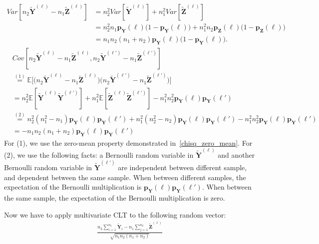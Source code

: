 \documentclass[11pt]{article} %
\newcommand{\vecBold}[1]{\boldsymbol{#1}} %
\newcommand{\distparamMultinom}{\boldsymbol{p}}
\newcommand{\mE}{\mathbb{E}} %
\newcommand{\rvY}{Y}
\newcommand{\rVecY}{\vecBold{\rvY}}
\newcommand{\rvZ}{Z}
\newcommand{\rVecZ}{\vecBold{\rvZ}}
\begin{document}
\begin{align*}
	Var[
n_2
		\tilde{\rVecY}^{(\ell)}
		-
		n_1
		\tilde{\rVecZ}^{(\ell)}	
	]
&=
n_2^2
	Var[
		\tilde{\rVecY}^{(\ell)}]
+		
n_1^2
Var[
\tilde{\rVecZ}^{(\ell)}	
	]
	\\
	&=
n_2^2 n_1
\distparamMultinom_{\rVecY}(\ell)
\bigl(
1-\distparamMultinom_{\rVecY}(\ell)
\bigr)
+		
n_1^2 n_2
\distparamMultinom_{\rVecZ}(\ell)
\bigl(
1-\distparamMultinom_{\rVecZ}(\ell)
\bigr)
\\&=
n_1n_2(n_1+n_2)
\distparamMultinom_{\rVecY}(\ell)
\bigl(
1-\distparamMultinom_{\rVecY}(\ell)
\bigr).
\end{align*}
%
\begin{align*}
	&
	Cov[
n_2\tilde{\rVecY}^{(\ell)}
		-
		n_1
		\tilde{\rVecZ}^{(\ell)}
,
n_2\tilde{\rVecY}^{(\ell')}
		-
		n_1
		\tilde{\rVecZ}^{(\ell')}	
	]
\\&\stackrel{(1)}{=}
\mE
\bigl[
\bigl(
n_2\tilde{\rVecY}^{(\ell)}
		-
		n_1
		\tilde{\rVecZ}^{(\ell)}
\bigr)
\bigl(
n_2\tilde{\rVecY}^{(\ell')}
		-
		n_1
		\tilde{\rVecZ}^{(\ell')}
\bigr)
\bigr]
\\&=
n_2^2\mE[\tilde{\rVecY}^{(\ell)} \tilde{\rVecY}^{(\ell')}]
+
n_1^2\mE[\tilde{\rVecZ}^{(\ell)} \tilde{\rVecZ}^{(\ell')}]
-n_1^2 n_2^2
\distparamMultinom_{\rVecY}(\ell)
\distparamMultinom_{\rVecY}(\ell')
%
\\&\stackrel{(2)}{=}
n_2^2(n_1^2 - n_1)
\distparamMultinom_{\rVecY}(\ell)
\distparamMultinom_{\rVecY}(\ell')
+
n_1^2 (n_2^2 - n_2)
\distparamMultinom_{\rVecY}(\ell)
\distparamMultinom_{\rVecY}(\ell')
-n_1^2 n_2^2
\distparamMultinom_{\rVecY}(\ell)
\distparamMultinom_{\rVecY}(\ell')
\\&=
-n_1n_2(n_1+n_2)\distparamMultinom_{\rVecY}(\ell)
\distparamMultinom_{\rVecY}(\ell')
\end{align*}
For (1), we use the zero-mean property demonstrated in~\eqref{chisq_zero_mean}.
For (2), we use the following facts: a Bernoulli random variable in $\tilde{\rVecY}^{(\ell)}$ and another Bernoulli random variable in $\tilde{\rVecY}^{(\ell')}$ are independent between different sample, and dependent between the same sample. When between different samples, the expectation of the Bernoulli multiplication is  $\distparamMultinom_{\rVecY}(\ell)
\distparamMultinom_{\rVecY}(\ell')$.
 When between the same sample, the expectation of the Bernoulli multiplication is zero.
 
 Now we have to apply multivariate CLT to the following random vector:
 \begin{align*}
		\frac{
		n_2
		\sum_{i=1}^{n_1}
		\tilde{\rVecY}_i
		-
		n_1
		\sum_{j=1}^{n_2}
		\tilde{\rVecZ}^{(\ell)}
		}{
		\sqrt{n_1 n_2 (n_1 + n_2) }
		} 	
 \end{align*}
 
\end{document}
